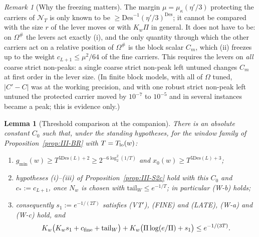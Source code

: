 \documentclass[10pt]{amsart}
\newtheorem{lemma}[theorem]{Lemma}
\theoremstyle{definition}
\theoremstyle{remark}
\newtheorem{remark}[theorem]{Remark}
\begin{document}
\begin{remark}[Why the freezing matters]\label{rem:III-PM}
The margin $\mu=\mu_\kappa(\eta'/3)$ protecting the carriers of $\mathcal N_T$
is only known to be $\ge\mathrm{Des}^{-1}(\eta'/3)^{\mathrm{Des}}$; it cannot be compared
with the size $r$ of the lever moves or with $K_w\Pi$ in general.  It does not
have to be: on $\Omega^\#$ the levers act exactly (i), and the only quantity
through which the other carriers act on a relative position of $\Omega^\#$ is
the block scalar $C_m$, which (ii) freezes up to the weight $c_{L+1}\le
\mu^2/64$ of the fine carriers.  This requires the levers on \emph{all} coarse
strict non-peaks: a single coarse strict non-peak left untuned changes $C_m$
at first order in the lever size.  (In finite block models, with all of
$\Omega$ tuned, $|C'-C|$ was at the working precision, and with one robust
strict non-peak left untuned the protected carrier moved by $10^{-7}$ to
$10^{-5}$ and in several instances became a peak; this is evidence only.)
\end{remark}

\begin{lemma}[Threshold comparison at the companion]\label{lem:III-S2ctr}
There is an absolute constant $C_0$ such that, under the standing hypotheses,
for the window family of Proposition~\textup{\ref{prop:III-BR}} with $T=T_{\rm lo}(w)$:
\begin{enumerate}
\item[(i)] $g_{\min}(w)\ge T^{5\mathrm{Des}(L)+2}\ge2^{-6\log_2^2(1/T)}$ and $x_0(w)\ge
T^{5\mathrm{Des}(L)+3}$;
\item[(ii)] hypotheses \textup{(i)--(iii)} of Proposition~\textup{\ref{prop:III-S2c}}
hold with this $C_0$ and $c_*:=c_{L+1}$, once $N_w$ is chosen with
$\mathrm{tail}_W\le e^{-1/T}$; in particular \textup{(W-b)} holds;
\item[(iii)] consequently $s_1:=e^{-1/(2T)}$ satisfies \textup{(VT$'$)},
\textup{(FINE)} and \textup{(LATE)}, \textup{(W-a)} and \textup{(W-c)} hold, and
\[
 K_w\big(K_ws_1+c_{\rm fine}+\mathrm{tail}_W\big)+K_w\big(\Pi\log(e/\Pi)+s_1\big)\le
 e^{-1/(3T)} .
\]
\end{enumerate}
\end{lemma}
\end{document}
